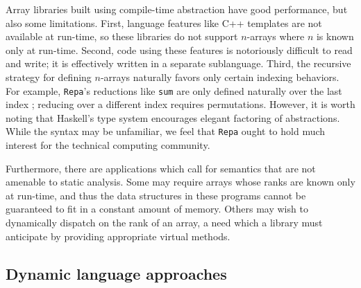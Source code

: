 \documentclass[preprint]{sigplanconf}
\newcommand{\code}[1]{\texttt{#1}}
\begin{document}
Array libraries built using compile-time abstraction have good performance,
but also some limitations.
First, language features like C++ templates are not available at run-time, so these
libraries do not support $n$-arrays where $n$ is known only at run-time.
Second, code using these features is
notoriously difficult to read and write; it is effectively written in a
separate sublanguage.
Third, the recursive strategy for defining $n$-arrays
naturally favors only certain indexing behaviors. For example,
\code{Repa}'s reductions like \code{sum} are only defined naturally over the
last index \cite{Keller:2010rs}; reducing over a different index requires
permutations.
However, it is worth noting that Haskell's type system encourages
elegant factoring of abstractions. While the syntax may be unfamiliar,
we feel that \code{Repa} ought to hold much interest for the technical computing
community.

Furthermore, there are applications which call for semantics that are not amenable
to static analysis. Some may require arrays whose ranks are known
only at run-time, and thus the data structures in these programs cannot be
guaranteed to fit in a constant amount of memory. Others may
wish to dynamically dispatch on the rank of an array, a need which a
library must anticipate by providing appropriate virtual methods.


\subsection{Dynamic language approaches}
\end{document}
